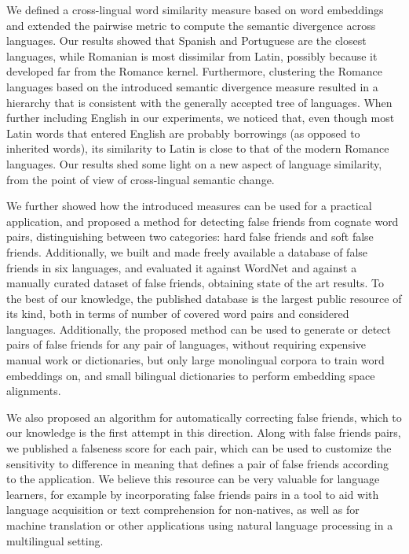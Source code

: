 \documentclass[output=paper]{langsci/langscibook}
\begin{document}
We defined a cross-lingual word similarity measure based on word embeddings and extended the pairwise metric to compute the semantic divergence across languages. Our results showed that Spanish and Portuguese are the closest languages, while Romanian is most dissimilar from Latin, possibly because it developed far from the Romance kernel. Furthermore, clustering the Romance languages based on the introduced semantic divergence measure resulted in a hierarchy that is consistent with the generally accepted tree of languages. When further including English in our experiments, we noticed that, even though most Latin words that entered English are probably borrowings (as opposed to inherited words), its similarity to Latin is close to that of the modern Romance languages. Our results shed some light on a new aspect of language similarity, from the point of view of cross-lingual semantic change.

We further showed how the introduced measures can be used for a practical application, and proposed a method for detecting false friends from cognate word pairs, distinguishing between two categories: hard false friends and soft false friends. Additionally, we built and made freely available a database of false friends in six languages, and evaluated it against WordNet and against a manually curated dataset of false friends, obtaining state of the art results.
To the best of our knowledge, the published database is the largest public resource of its kind, both in terms of number of covered word pairs and considered languages. Additionally, the proposed method can be used to generate or detect pairs of false friends for any pair of languages, without requiring expensive manual work or dictionaries, but only large monolingual corpora to train word embeddings on, and small bilingual dictionaries to perform embedding space alignments.

\begin{sloppypar}
We also proposed an algorithm for automatically correcting false friends, which to our knowledge is the first attempt in this direction. 
Along with false friends pairs, we published a falseness score for each pair, which can be used to customize the sensitivity to difference in meaning that defines a pair of false friends according to the application. We believe this resource can be very valuable for language learners, for example by incorporating false friends pairs in a tool to aid with language acquisition or text comprehension for non-natives, as well as for machine translation or other applications using natural language processing in a multilingual setting.
\end{sloppypar}
\end{document}
